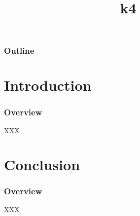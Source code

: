 %
%
%
%
%
%

%
%

%
%

\def\path{../../..}

%
%



%
%

\title{k4}

%
%



%
%

\begin{frame}
  \titlepage
\end{frame}

%
%

\begin{frame}
  \frametitle{Outline}

  \tableofcontents
\end{frame}

%
%

%
%

\section{Introduction}


\begin{frame}
  \frametitle{Overview}

  XXX
\end{frame}

%
%

\section{Conclusion}


\begin{frame}
  \frametitle{Overview}

  XXX
\end{frame}

